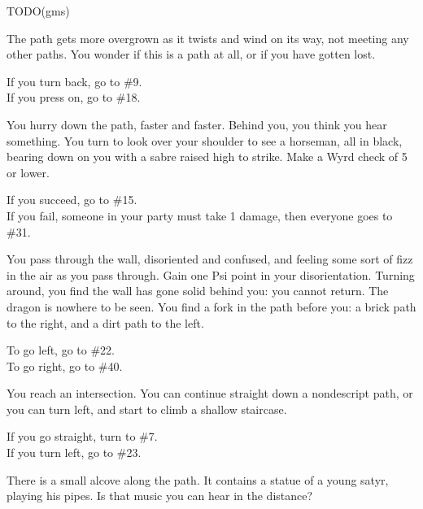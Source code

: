 \documentclass[green]{gl2018}
\begin{document}
\begin{large}
\begin{location}{24}
\end{location}
\begin{location}{25}
TODO(gms)
\end{location}
\begin{location}{26}
The path gets more overgrown as it twists and wind on its way, not meeting any other paths. You wonder if this is a path at all, or if you have gotten lost. 
\begin{fromhere}If you turn back, go to \#9.\\ If you press on, go to \#18.\end{fromhere}
\end{location}
\begin{location}{27}
You hurry down the path,  faster and faster. Behind you, you think you hear something. You turn to look over your shoulder to see a horseman, all in black, bearing down on you with a sabre raised high to strike. Make a Wyrd check of 5 or lower. 
\begin{fromhere}
If you succeed, go to \#15.\\
 If you fail, someone in your party must take 1 damage, then everyone goes to \#31.
\end{fromhere}
\end{location}
\begin{location}{28}
You pass through the wall, disoriented and confused, and feeling some sort of fizz in the air as you pass through.  Gain one Psi point in your disorientation.  Turning around, you find the wall has gone solid behind you: you cannot return.  The dragon is nowhere to be seen.  You find a fork in the path before you: a brick path to the right, and a dirt path to the left.  
\begin{fromhere}To go left, go to \#22.\\  To go right, go to \#40.\end{fromhere}
\end{location}
\begin{location}{29}
You reach an intersection. You can continue straight down a nondescript path, or you can turn left, and start to climb a shallow staircase.  
\begin{fromhere}If you go straight, turn to \#7.\\ If you turn left, go to \#23.\end{fromhere}
\end{location}
\begin{location}{30}
There is a small alcove along the path. It contains a statue of a young satyr, playing his pipes. Is that music you can hear in the distance? 

\end{location}
\end{large}
\end{document}

